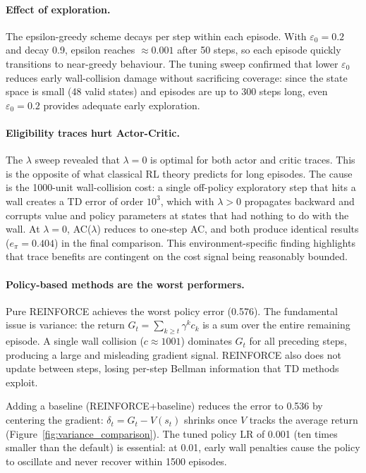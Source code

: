 \documentclass[11pt]{article}
\begin{document}
\paragraph{Effect of exploration.}
The epsilon-greedy scheme decays per step within each episode.  With
$\varepsilon_0=0.2$ and decay 0.9, epsilon reaches $\approx 0.001$ after 50
steps, so each episode quickly transitions to near-greedy behaviour.  The
tuning sweep confirmed that lower $\varepsilon_0$ reduces early wall-collision
damage without sacrificing coverage: since the state space is small (48 valid
states) and episodes are up to 300 steps long, even $\varepsilon_0=0.2$
provides adequate early exploration.

\paragraph{Eligibility traces hurt Actor-Critic.}
The $\lambda$ sweep revealed that $\lambda=0$ is optimal for both actor and
critic traces.  This is the opposite of what classical RL theory predicts for
long episodes.  The cause is the 1000-unit wall-collision cost: a single
off-policy exploratory step that hits a wall creates a TD error of order
$10^3$, which with $\lambda>0$ propagates backward and corrupts value and
policy parameters at states that had nothing to do with the wall.  At
$\lambda=0$, AC($\lambda$) reduces to one-step AC, and both produce identical
results ($e_\pi=0.404$) in the final comparison.  This environment-specific
finding highlights that trace benefits are contingent on the cost signal being
reasonably bounded.

\paragraph{Policy-based methods are the worst performers.}
Pure REINFORCE achieves the worst policy error (0.576).  The fundamental issue
is variance: the return $G_t = \sum_{k\geq t}\gamma^k c_k$ is a sum over the
entire remaining episode.  A single wall collision ($c \approx 1001$) dominates
$G_t$ for all preceding steps, producing a large and misleading gradient signal.
REINFORCE also does not update between steps, losing per-step Bellman
information that TD methods exploit.

Adding a baseline (REINFORCE+baseline) reduces the error to 0.536 by centering
the gradient: $\delta_t = G_t - V(s_t)$ shrinks once $V$ tracks the average
return (Figure~\ref{fig:variance_comparison}).  The tuned policy LR of 0.001
(ten times smaller than the default) is essential: at 0.01, early wall penalties
cause the policy to oscillate and never recover within 1500 episodes.
\end{document}
